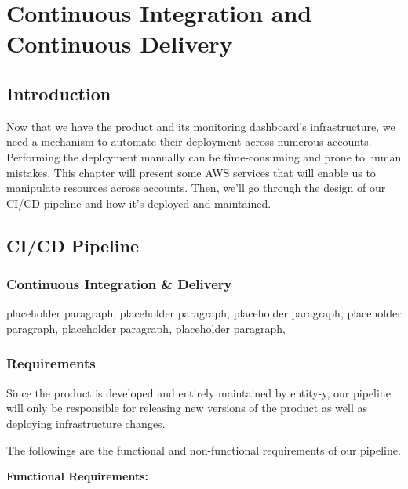 \chapter{Continuous Integration and Continuous Delivery}
\section*{Introduction}
\qquad 

Now that we have the product and its monitoring dashboard's infrastructure, we need a mechanism to automate their deployment across numerous accounts. Performing the deployment manually can be time-consuming and prone to human mistakes.
This chapter will present some AWS services that will enable us to manipulate resources across accounts. Then, we'll go through the design of our CI/CD pipeline and how it's deployed and maintained.

\label{chap_5}
\newpage
\section{CI/CD Pipeline }
\qquad 

\subsection{Continuous Integration \& Delivery}

placeholder paragraph, placeholder paragraph, placeholder paragraph, placeholder paragraph, placeholder paragraph, placeholder paragraph,

\subsection{Requirements}
\qquad 

Since the product is developed and entirely maintained by entity-y, our pipeline will only be responsible for releasing new versions of the product as well as deploying infrastructure changes.

The followings are the functional and non-functional requirements of our pipeline. 

\textbf{Functional Requirements:}

